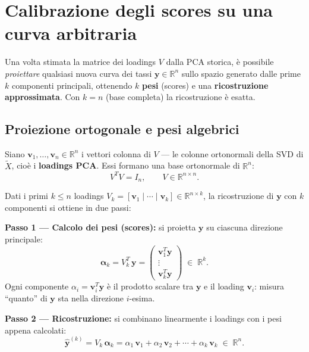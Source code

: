 \documentclass[11pt,a4paper]{article}
\theoremstyle{plain}
\theoremstyle{definition}
\theoremstyle{remark}
\begin{document}
\section{Calibrazione degli scores su una curva arbitraria}
\label{sec:calibrazione}

Una volta stimata la matrice dei loadings $V$ dalla PCA storica, è possibile
\emph{proiettare} qualsiasi nuova curva dei tassi $\mathbf{y} \in \mathbb{R}^n$
sullo spazio generato dalle prime $k$ componenti principali, ottenendo
$k$ \textbf{pesi} (scores) e una \textbf{ricostruzione approssimata}.
Con $k = n$ (base completa) la ricostruzione è esatta.

\subsection{Proiezione ortogonale e pesi algebrici}

Siano $\mathbf{v}_1, \ldots, \mathbf{v}_n \in \mathbb{R}^n$ i vettori colonna
di $V$ --- le colonne ortonormali della SVD di $\tilde{X}$, cioè i
\textbf{loadings PCA}. Essi formano una base ortonormale di $\mathbb{R}^n$:
\[
  V^T V = I_n, \qquad V \in \mathbb{R}^{n \times n}.
\]

Dati i primi $k \leq n$ loadings $V_k = [\mathbf{v}_1 \mid \cdots \mid \mathbf{v}_k]
\in \mathbb{R}^{n \times k}$, la ricostruzione di $\mathbf{y}$ con $k$
componenti si ottiene in due passi:

\begin{keybox}
\textbf{Passo 1 --- Calcolo dei pesi (scores):} si proietta $\mathbf{y}$
su ciascuna direzione principale:
\[
  \boldsymbol{\alpha}_k = V_k^T\,\mathbf{y}
  = \begin{pmatrix} \mathbf{v}_1^T \mathbf{y} \\ \vdots \\ \mathbf{v}_k^T \mathbf{y} \end{pmatrix}
  \;\in\; \mathbb{R}^k.
\]
Ogni componente $\alpha_i = \mathbf{v}_i^T \mathbf{y}$ è il prodotto scalare
tra $\mathbf{y}$ e il loading $\mathbf{v}_i$: misura ``quanto'' di $\mathbf{y}$
sta nella direzione $i$-esima.

\medskip
\textbf{Passo 2 --- Ricostruzione:} si combinano linearmente i loadings
con i pesi appena calcolati:
\[
  \hat{\mathbf{y}}^{(k)} = V_k\,\boldsymbol{\alpha}_k
  = \alpha_1\,\mathbf{v}_1 + \alpha_2\,\mathbf{v}_2 + \cdots + \alpha_k\,\mathbf{v}_k
  \;\in\; \mathbb{R}^n.
\]
\end{keybox}
\end{document}
